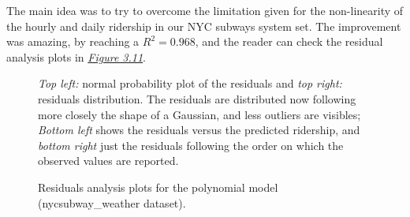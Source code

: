 \documentclass[a4paper,12pt,english]{sphinxmanual}
\begin{document}
The main idea was to try to overcome the limitation given for the non-linearity
of the hourly and daily ridership in our NYC subways system set. The improvement
was amazing, by reaching a \(R^2 = 0.968\), and the reader can check the
residual analysis plots in {\hyperref[section2:figure311]{\emph{Figure 3.11}}}.
\begin{figure}[htbp]
\centering
\capstart

\caption{Residuals analysis plots for the polynomial model (nycsubway\_weather dataset).}{\small 
\emph{Top left:} normal probability plot of the residuals and \emph{top right:} residuals
distribution. The residuals are distributed now following more closely the shape
of a Gaussian, and less outliers are visibles; \emph{Bottom left} shows the residuals
versus the predicted ridership, and \emph{bottom right} just the residuals following
the order on which the observed values are reported.
}\label{section2:figure311}\end{figure}
\end{document}
